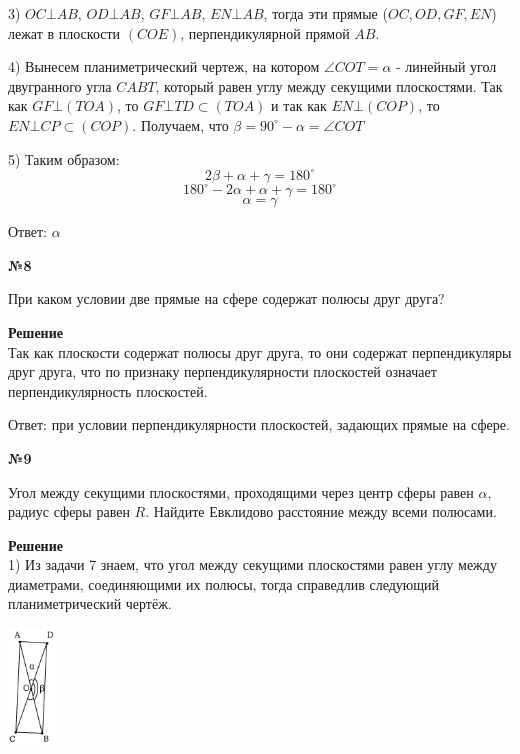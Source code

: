     3) $OC \bot AB$, $OD \bot AB$, $GF \bot AB$, $EN \bot AB$,
    тогда эти прямые ($OC, OD, GF, EN$) лежат в плоскости $(COE)$, перпендикулярной прямой $AB$.

    4) Вынесем планиметрический чертеж, на котором $\angle COT = \alpha$ - линейный угол двугранного угла $CABT$,
    который равен углу между секущими плоскостями.
    Так как $GF \bot (TOA)$, то $GF \bot TD \subset (TOA)$ и так как $EN \bot (COP)$, то $EN \bot CP \subset (COP)$.
    Получаем, что $\beta = 90^\circ - \alpha = \angle COT$

    5) Таким образом:
    \[
        2\beta + \alpha + \gamma = 180^{\circ}
    \]
    \[
        180^{\circ} - 2\alpha + \alpha + \gamma = 180 ^{\circ}
    \]
    \[ \alpha = \gamma \]

    Ответ: $\alpha$

    \begin{center}
        \textbf{№8}
    \end{center}

    При каком условии две прямые на сфере содержат полюсы друг друга?

    \textbf{Решение}\\

    Так как плоскости содержат полюсы друг друга, то они содержат перпендикуляры друг друга,
    что по признаку перпендикулярности плоскостей означает перпендикулярность плоскостей.

    Ответ: при условии перпендикулярности плоскостей, задающих прямые на сфере.

    \begin{center}
        \textbf{№9}
    \end{center}

    Угол между секущими плоскостями, проходящими через центр сферы равен $\alpha$, радиус сферы равен $R$.
    Найдите Евклидово расстояние между всеми полюсами.

    \textbf{Решение}\\

    1) Из задачи 7 знаем, что угол между секущими плоскостями равен углу между диаметрами, соединяющими их полюсы,
    тогда справедлив следующий планиметрический чертёж.

    \begin{center}
        \includegraphics[width=0.1\textwidth]{images/img5}\\
    \end{center}

